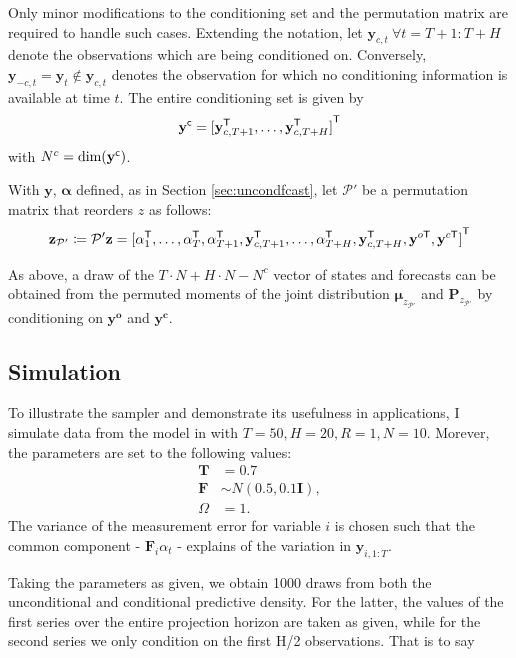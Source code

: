 \documentclass[notitlepage,a4paper,12pt]{article}
\newcommand{\transpose}[1]{{#1}^{\sf{T}}}
\begin{document}
Only minor modifications to the conditioning set and the permutation matrix are required to handle such cases. Extending the notation, let $\mathbf{y}_{c,t}\: \forall t = T+1:T+H$ denote the observations which are being conditioned on. Conversely, $\mathbf{y}_{-c,t} = \mathbf{y}_t\notin\mathbf{y}_{c,t}$ denotes the observation for which no conditioning information is available at time $t$. The entire conditioning set is given by 
$$
\mathbf{y}^{\sf{c}} = \transpose{[\mathbf{y}^{\sf{T}}_{c,T+1}, \dots, \mathbf{y}^{\sf{T}}_{c,T+H}]}
$$ 
with $N^c = \text{dim}(\mathbf{y}^{\sf{c}})$.

With $\mathbf{y}$, $\boldsymbol{\alpha}$ defined, as in Section \ref{sec:uncondfcast}, let $\mathcal{P}'$ be a permutation matrix that reorders $z$ as follows:
$$
\mathbf{z}_{\mathcal{P}'} \coloneqq \mathcal{P}' \mathbf{z} =
 \transpose{[
     \alpha^{\sf{T}}_1, 
     \dots, 
     \alpha^{\sf{T}}_T, 
     \alpha^{\sf{T}}_{T+1}, 
     \mathbf{y}^{\sf{T}}_{c,T+1}, 
     \dots, 
     \alpha^{\sf{T}}_{T+H}, 
     \mathbf{y}^{\sf{T}}_{c,T+H},
     \mathbf{y}^{o\sf{T}},
     \mathbf{y}^{c\sf{T}}]}
$$

As above, a draw of the $T\!\cdot\!N + H\!\cdot\!N - N^c$ vector of states and forecasts can be obtained from the permuted moments of the joint distribution $\boldsymbol{\mu}_{z_{\mathcal{P}'}} $ and $\mathbf{P}_{z_{\mathcal{P}'}} $ by conditioning on $\mathbf{y^{o}}$ and $\mathbf{y^c}$. 

\subsection{Simulation}

To illustrate the sampler and demonstrate its usefulness in applications, I simulate data from the model in with $T=50, H=20, R = 1, N=10$. Morever, the parameters are set to the following values: 
\begin{align*}
\mathbf{T} &= 0.7 \\
\mathbf{F} &\sim N(0.5, 0.1 \mathbf{I}), \\
\Omega &= 1.
\end{align*}
The variance of the measurement error for variable $i$ is chosen such that the common component - $\mathbf{F}_i \alpha_t$ - explains  of the variation in $\mathbf{y}_{i,1:T}$. 

Taking the parameters as given, we obtain 1000 draws from both the unconditional and conditional predictive density. For the latter, the values of the first series over the entire projection horizon are taken as given, while for the second series we only condition on the first H/2 observations. That is to say 
\end{document}
